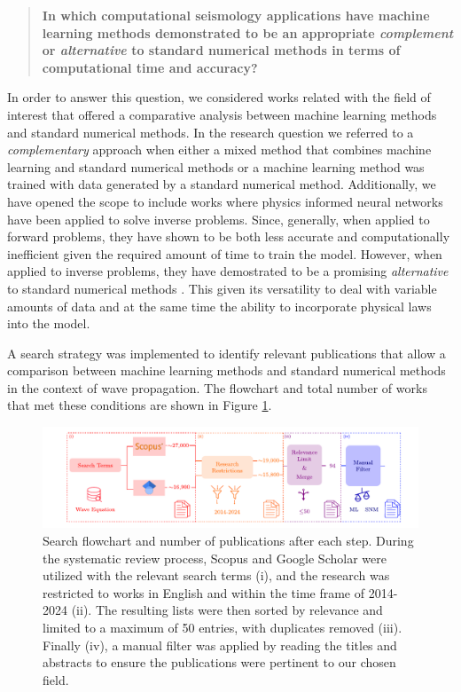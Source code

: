 \documentclass[11pt,twoside]{article}
\begin{document}
\begin{quote}
\noindent\textbf{In which computational seismology applications have machine learning methods demonstrated to be 
an appropriate \textit{complement} or \textit{alternative} to standard numerical methods in terms of computational 
time and accuracy?}
\end{quote}

In order to answer this question, we considered works related with the field of interest that offered a comparative 
analysis between machine learning methods and standard numerical methods. In the research question we referred to 
a \textit{complementary} approach when either a mixed method that combines machine learning and standard numerical methods 
or a machine learning method was trained with data generated by a standard numerical method. Additionally, we have 
opened the scope to include works where physics informed neural networks have been applied to solve inverse problems. 
Since, generally, when applied to forward problems, they have shown to be both less accurate and computationally 
inefficient given the required amount of time to train the model. However, when applied to inverse problems, they have 
demostrated to be a promising \textit{alternative} to standard numerical methods 
\citep{haghighat_physics-informed_2021,raissi_hidden_2020}. This given its versatility to 
deal with variable amounts of data and at the same time the ability to incorporate physical laws into the model.  

A search strategy was implemented to identify relevant publications that allow a comparison between machine 
learning methods and standard numerical methods in the context of wave propagation. The flowchart and total 
number of works that met these conditions are shown in Figure \ref{fig:scheme_systematic_review}.

\begin{figure}[h]
    \includegraphics[width=1.0\textwidth]{figs/scheme_systematic_review.pdf}
\caption{Search flowchart and number of publications after each step. During the systematic review process, 
Scopus and Google Scholar were utilized with the relevant search terms (i), and the research was restricted to works 
in English and within the time frame of 2014-2024 (ii). The resulting lists were then sorted by relevance and limited 
to a maximum of 50 entries, with duplicates removed (iii). Finally (iv), a manual filter was applied by reading the 
titles and abstracts to ensure the publications were pertinent to our chosen field.}\label{fig:scheme_systematic_review}
\end{figure}
\end{document}
